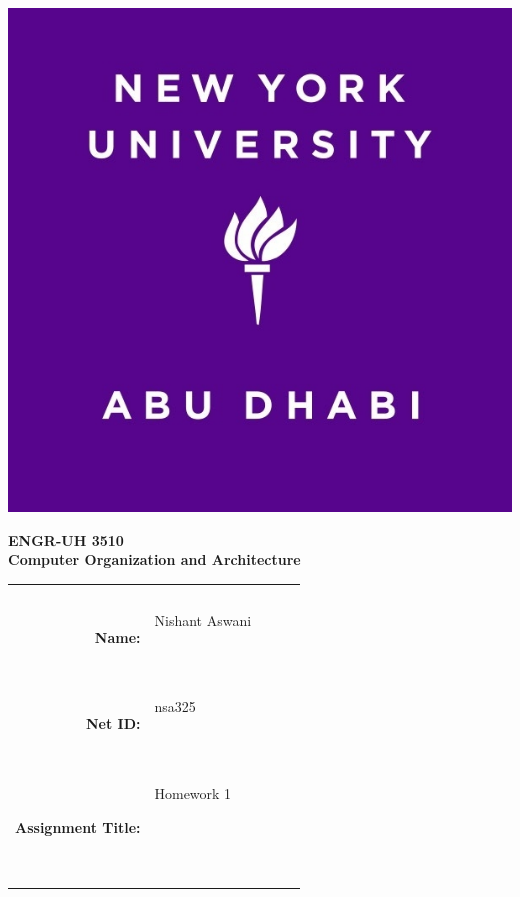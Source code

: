 \documentclass[11pt]{exam}
\newcommand{\myname}{Nishant Aswani}
\newcommand{\mynetid}{nsa325}
\newcommand{\myhwtype}{Homework}
\newcommand{\myhwnum}{1}
\newcommand{\mycoursenumber}{ENGR-UH 3510}
\newcommand{\myclassname}{Computer Organization and Architecture}
\begin{document}
\begin{center}
  \includegraphics[scale=0.15]{source/NYUAD-alt-logo.jpg}
\end{center}

{\vspace{1.5em}}

\begin{center}
    \Huge{\textbf{\mycoursenumber}}\\
    {\vspace{0.5em}}
    \Huge{\textbf{\myclassname}}
\end{center}

{\vspace{10em}}

\begin{center}
  \begin{tabular}{|rp{5.0cm}lll|}
    \hline
    &  &  &  & \\
    &  &  &  & \\
    \Large{\textbf{Name:}} & \Large{\myname}
    
    \  &  &  & \\
    \Large{\textbf{Net ID:}} & \Large{\mynetid}
    
    \  &  &  & \\
    \Large{\textbf{Assignment Title:}} & \Large{\myhwtype{} \myhwnum}
    
    \
    
    \  &  &  & \\
    \hline
  \end{tabular}
\end{center}
\end{document}
